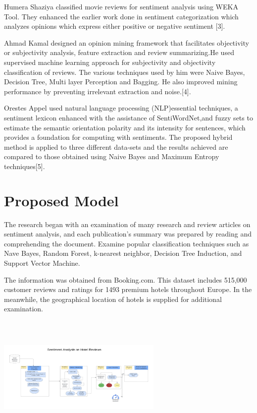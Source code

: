  \par Humera Shaziya classified movie reviews for sentiment analysis using WEKA Tool. They enhanced the earlier work done in sentiment categorization which analyzes opinions which express either positive or negative sentiment
[3].

Ahmad Kamal designed an opinion mining framework that facilitates objectivity or subjectivity analysis, feature extraction and review summarizing.He used supervised machine learning approach for subjectivity and objectivity classification of reviews. The various techniques used by him were Naive Bayes, Decision Tree, Multi layer Perception and Bagging. He also improved mining performance by preventing irrelevant extraction and noise.[4].\par

Orestes Appel used natural language processing (NLP)essential techniques, a sentiment lexicon enhanced with the assistance of SentiWordNet,and fuzzy sets to estimate the semantic orientation polarity and its intensity for sentences,
which provides a foundation for computing with sentiments. The proposed hybrid method is applied to three different data-sets and the results achieved are compared to those obtained
using Naive Bayes and Maximum Entropy techniques[5].
\section{Proposed Model}
The research began with an examination of many research and review articles on sentiment analysis, and each publication's summary was prepared by reading and comprehending the document. Examine popular classification techniques such as Nave Bayes, Random Forest, k-nearest neighbor, Decision Tree Induction, and Support Vector Machine.

The information was obtained from Booking.com. This dataset includes 515,000 customer reviews and ratings for 1493 premium hotels throughout Europe. In the meanwhile, the geographical location of hotels is supplied for additional examination.

\includegraphics[width=8cm, height=6cm]{block.jpeg}
